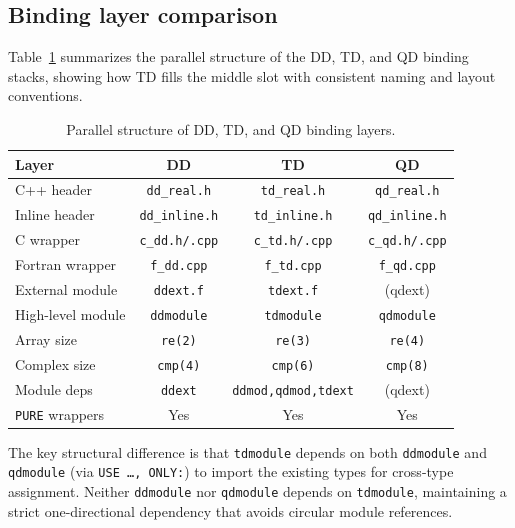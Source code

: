 \documentclass[11pt,a4paper]{article}
\begin{document}
\subsection{Binding layer comparison}

Table~\ref{tab:binding-layers} summarizes the parallel structure
of the DD, TD, and QD binding stacks, showing how TD fills the
middle slot with consistent naming and layout conventions.

\begin{table}[h]
\centering
\caption{Parallel structure of DD, TD, and QD binding layers.}
\label{tab:binding-layers}
\begin{tabular}{lccc}
\toprule
Layer & DD & TD & QD \\
\midrule
C++ header       & \texttt{dd\_real.h}   & \texttt{td\_real.h}   & \texttt{qd\_real.h}   \\
Inline header    & \texttt{dd\_inline.h} & \texttt{td\_inline.h} & \texttt{qd\_inline.h} \\
C wrapper        & \texttt{c\_dd.h/.cpp} & \texttt{c\_td.h/.cpp} & \texttt{c\_qd.h/.cpp} \\
Fortran wrapper  & \texttt{f\_dd.cpp}    & \texttt{f\_td.cpp}    & \texttt{f\_qd.cpp}    \\
External module  & \texttt{ddext.f}      & \texttt{tdext.f}      & (qdext)               \\
High-level module& \texttt{ddmodule}     & \texttt{tdmodule}     & \texttt{qdmodule}     \\
\midrule
Array size       & \texttt{re(2)}        & \texttt{re(3)}        & \texttt{re(4)}        \\
Complex size     & \texttt{cmp(4)}       & \texttt{cmp(6)}       & \texttt{cmp(8)}       \\
Module deps      & \texttt{ddext}        & \texttt{ddmod,qdmod,tdext} & (qdext)          \\
\texttt{PURE} wrappers & Yes             & Yes                   & Yes                   \\
\bottomrule
\end{tabular}
\end{table}

The key structural difference is that \texttt{tdmodule} depends
on both \texttt{ddmodule} and \texttt{qdmodule} (via
\texttt{USE \ldots, ONLY:}) to import the existing types for
cross-type assignment.  Neither \texttt{ddmodule} nor
\texttt{qdmodule} depends on \texttt{tdmodule}, maintaining a
strict one-directional dependency that avoids circular module
references.
\end{document}
